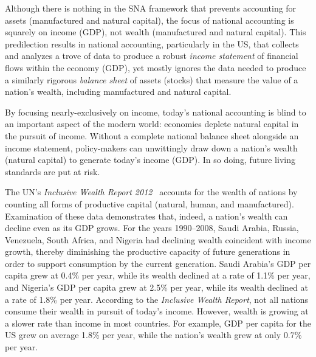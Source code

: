 
Although there is nothing in the SNA framework that prevents 
accounting for assets (manufactured and natural capital),
the focus of national accounting is squarely on income (GDP), 
not wealth (manufactured and natural capital).\cite[p.~415]{UNSNA2008}  
This predilection results in national accounting,
particularly in the US, that collects and analyzes a trove of data to
produce a robust \emph{income statement} of financial flows within the economy (GDP),
yet mostly ignores the data needed to produce a similarly rigorous
\emph{balance sheet} of assets (stocks) that measure the value 
of a nation's wealth, including manufactured and natural capital.

By focusing nearly-exclusively on income, 
today's national accounting is blind to an important aspect of the modern world:
economies deplete natural capital in the pursuit of income.
Without a complete national balance sheet alongside an income statement, 
policy-makers can unwittingly draw down a nation's wealth (natural capital) 
to generate today's income (GDP). 
In so doing, future living standards are put at risk. 

The UN's \emph{Inclusive Wealth Report 2012}~\cite{IWR2012}
accounts for the wealth of nations by counting all forms of productive capital 
(natural, human, and manufactured).  
Examination of these data demonstrates that, indeed, 
a nation's wealth can decline even as its GDP grows. 
For the years 1990--2008, Saudi Arabia, Russia, Venezuela, South Africa, and Nigeria 
had declining wealth coincident with income growth,
thereby diminishing the productive capacity of future generations
in order to support consumption by the current generation.
Saudi Arabia's GDP per capita grew at 0.4\% per year, 
while its wealth declined at a rate of 1.1\% per year, 
and Nigeria's GDP per capita grew at 2.5\% per year, 
while its wealth declined at a rate of 1.8\% per year.
According to the \emph{Inclusive Wealth Report}, 
not all nations consume their wealth in pursuit of today's income. 
However, wealth is growing at a slower rate than income
in most countries.
For example, GDP per capita for the US grew on average 1.8\% per year, 
while the nation's wealth grew at only 0.7\% per year.\cite[p.~44]{IWR2012}

